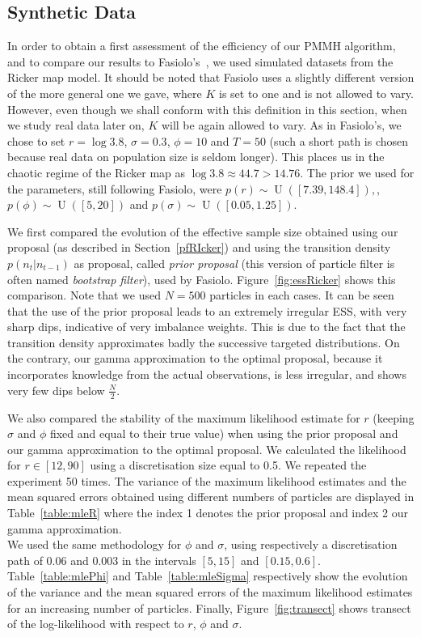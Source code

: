 \documentclass[12pt]{article}
\begin{document}
	
	\subsection{Synthetic Data}
	In order to obtain a first assessment of the efficiency of our PMMH algorithm, and to compare our results to Fasiolo's~\cite{fasiolo2014statistical}, we used simulated datasets from the Ricker map model. It should be noted that Fasiolo uses a slightly different version of the more general one we gave, where $K$ is set to one and is not allowed to vary. However, even though we shall conform with this definition in this section, when we study real data later on, $K$ will be again allowed to vary. As in Fasiolo's, we chose to set $r=\log 3.8$, $\sigma=0.3$, $\phi=10$ and $T=50$ (such a short path is chosen because real data on population size is seldom longer). This places us in the  chaotic regime of the Ricker map as $\log 3.8 \approx 44.7 > 14.76$. The prior we used for the parameters, still following Fasiolo, were $p(r) \sim \operatorname{U}([7.39, 148.4]),$, $p(\phi) \sim \operatorname{U}([5, 20])$ and $p(\sigma) \sim \operatorname{U}([0.05, 1.25])$.
	
	We first compared the evolution of the effective sample size obtained using our proposal (as described in Section~\ref{pfRIcker}) and using the transition density $p(n_t|n_{t-1})$ as proposal, called \emph{prior proposal} (this version of particle filter is often named \emph{bootstrap filter}), used by Fasiolo. Figure~\ref{fig:essRicker} shows this comparison. Note that we used $N=500$ particles in each cases. It can be seen that the use of the prior proposal leads to an extremely irregular ESS, with very sharp dips, indicative of very imbalance weights. This is due to the fact that the transition density approximates badly the successive targeted distributions. On the contrary, our gamma approximation to the optimal proposal, because it incorporates knowledge from the actual observations, is less irregular, and shows very few dips below $\frac{N}{2}$.
	
	We also compared the stability of the maximum likelihood estimate for $r$ (keeping $\sigma$ and $\phi$ fixed and equal to their true value) when using the prior proposal and our gamma approximation to the optimal proposal. We calculated the likelihood for $r \in [12, 90]$ using a discretisation size equal to 0.5. We repeated the experiment 50 times. The variance of the maximum likelihood estimates and the mean squared errors obtained using different numbers of particles are displayed in Table~\ref{table:mleR} where the index 1 denotes the prior proposal and index 2 our gamma approximation. \\
	We used the same methodology for $\phi$ and $\sigma$, using respectively a discretisation path of 0.06 and 0.003 in the intervals $[5, 15]$ and $[0.15, 0.6]$. Table~\ref{table:mlePhi} and Table~\ref{table:mleSigma} respectively show the evolution of the variance and the mean squared errors of the maximum likelihood estimates for an increasing number of particles. Finally, Figure~\ref{fig:transect} shows transect of the log-likelihood with respect to $r$, $\phi$ and $\sigma$. 
	
\end{document}
